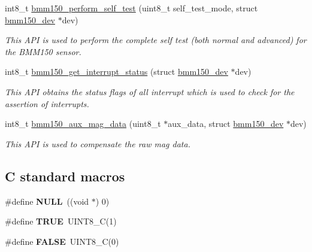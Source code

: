 \begin{DoxyCompactItemize}
int8\+\_\+t \hyperlink{group___b_m_m150_gaabaad6846eae116f278af4c87d432b2f}{bmm150\+\_\+perform\+\_\+self\+\_\+test} (uint8\+\_\+t self\+\_\+test\+\_\+mode, struct \hyperlink{structbmm150__dev}{bmm150\+\_\+dev} $\ast$dev)
\begin{DoxyCompactList}\small\item\em This A\+PI is used to perform the complete self test (both normal and advanced) for the B\+M\+M150 sensor. \end{DoxyCompactList}\item 
int8\+\_\+t \hyperlink{group___b_m_m150_gadee930eb8e5ef947b87ee8c217780143}{bmm150\+\_\+get\+\_\+interrupt\+\_\+status} (struct \hyperlink{structbmm150__dev}{bmm150\+\_\+dev} $\ast$dev)
\begin{DoxyCompactList}\small\item\em This A\+PI obtains the status flags of all interrupt which is used to check for the assertion of interrupts. \end{DoxyCompactList}\item 
int8\+\_\+t \hyperlink{group___b_m_m150_gabc0895a5c1c847e18e33daf5cd69c1b6}{bmm150\+\_\+aux\+\_\+mag\+\_\+data} (uint8\+\_\+t $\ast$aux\+\_\+data, struct \hyperlink{structbmm150__dev}{bmm150\+\_\+dev} $\ast$dev)
\begin{DoxyCompactList}\small\item\em This A\+PI is used to compensate the raw mag data. \end{DoxyCompactList}\end{DoxyCompactItemize}
\subsection*{C standard macros}
\begin{DoxyCompactItemize}
\item 
\mbox{\label{group___b_m_m150_ga070d2ce7b6bb7e5c05602aa8c308d0c4}} 
\#define {\bfseries N\+U\+LL}~((void $\ast$) 0)
\item 
\mbox{\label{group___b_m_m150_gaa8cecfc5c5c054d2875c03e77b7be15d}} 
\#define {\bfseries T\+R\+UE}~U\+I\+N\+T8\+\_\+C(1)
\item 
\mbox{\label{group___b_m_m150_gaa93f0eb578d23995850d61f7d61c55c1}} 
\#define {\bfseries F\+A\+L\+SE}~U\+I\+N\+T8\+\_\+C(0)
\end{DoxyCompactItemize}
